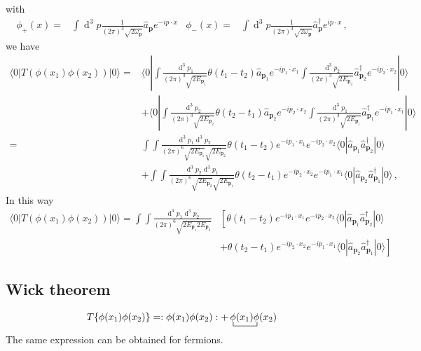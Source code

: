 with
\begin{align}
    \phi_+(x)=&\int \operatorname{d}^3p \frac{1}{(2\pi)^3\sqrt{2\omega_{\boldsymbol{p}} }}
\widehat{a}_{\boldsymbol{p}} e^{-i p\cdot x }&
    \phi_-(x)=&\int \operatorname{d}^3p \frac{1}{(2\pi)^3\sqrt{2\omega_{\boldsymbol{p}} }}
\widehat{a}_{\boldsymbol{p}}^\dagger e^{i p\cdot x }\,,
\end{align}
we have
\begin{align}
  \langle0|T(\phi(x_1)\phi(x_2))|0\rangle
=&\langle0|\int\frac{\operatorname{d}^3p_1}{(2\pi)^3\sqrt{2E_{\boldsymbol{p}_1}}}\theta(t_1-t_2)\hat{a}_{\boldsymbol{p}_1}e^{-i p_1\cdot x_1}
\int\frac{\operatorname{d}^3p_2}{(2\pi)^3\sqrt{2E_{\boldsymbol{p}_2}}}\hat{a}_{\boldsymbol{p}_2}^\dagger e^{-i p_2\cdot x_2}|0\rangle\nonumber\\
&+\langle0|\int\frac{\operatorname{d}^3p_2}{(2\pi)^3\sqrt{2E_{\boldsymbol{p}_2}}}\theta(t_2-t_1)\hat{a}_{\boldsymbol{p}_2}e^{-i p_2\cdot x_2}
\int\frac{\operatorname{d}^3p_1}{(2\pi)^3\sqrt{2E_{\boldsymbol{p}_1}}}\hat{a}_{\boldsymbol{p}_1}^\dagger e^{-i p_1\cdot x_1}|0\rangle\nonumber\\
=&\int\int\frac{\operatorname{d}^3p_1\operatorname{d}^3p_2}{(2\pi)^6\sqrt{2E_{\boldsymbol{p}_1}}\sqrt{2E_{\boldsymbol{p}_2}}}\theta(t_1-t_2)e^{-i p_1\cdot x_1}e^{-i p_2\cdot x_2}
\langle0|\hat{a}_{\boldsymbol{p}_1}\hat{a}_{\boldsymbol{p}_2}^\dagger|0\rangle\nonumber\\
&+\int\int\frac{\operatorname{d}^3p_2\operatorname{d}^3p_1}{(2\pi)^6\sqrt{2E_{\boldsymbol{p}_2}}\sqrt{2E_{\boldsymbol{p}_1}}}\theta(t_2-t_1)e^{-i p_2\cdot x_2}e^{-i p_1\cdot x_1}
\langle0|\hat{a}_{\boldsymbol{p}_2}\hat{a}_{\boldsymbol{p}_1}^\dagger|0\rangle\,,
\end{align}
In this way
\begin{align}
 \langle0|T(\phi(x_1)\phi(x_2))|0\rangle
  =\int\int\frac{\operatorname{d}^3p_1\operatorname{d}^3p_2}{(2\pi)^6\sqrt{2E_{\boldsymbol{p}_1}2E_{\boldsymbol{p}_2}}}
&\left[\theta(t_1-t_2)e^{-i p_1\cdot x_1}e^{-i p_2\cdot x_2}
\langle0|\hat{a}_{\boldsymbol{p}_1}\hat{a}_{\boldsymbol{p}_2}^\dagger|0\rangle \right. \nonumber\\
&\left.  + \theta(t_2-t_1)e^{-i p_2\cdot x_2}e^{-i p_1\cdot x_1}
\langle0|\hat{a}_{\boldsymbol{p}_2}\hat{a}_{\boldsymbol{p}_1}^\dagger|0\rangle \right]
\end{align}




  

\subsection{Wick theorem}
\begin{align}
  T\{\phi(x_1)\phi(x_2)\}=:\phi(x_1)\phi(x_2):+\bcontraction{\,}{\phi}{(x_1)}{\phi}
\,\phi(x_1)\phi(x_2)
\end{align}
The same expression can be obtained for fermions.

